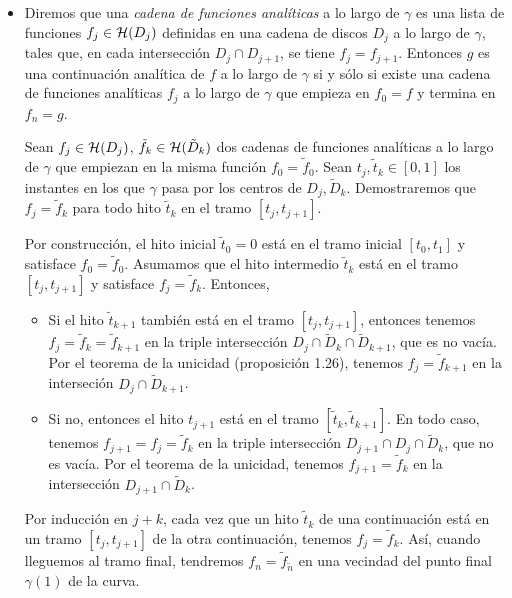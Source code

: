 \begin{solution}
\leavevmode
\begin{itemize}
    \item Diremos que una \textit{cadena de funciones analíticas} a lo largo de $\gamma$ es una lista de funciones $f_j \in \mathcal H(D_j)$ definidas en una cadena de discos $D_j$ a lo largo de $\gamma$, tales que, en cada intersección $D_j \cap D_{j+1}$, se tiene $f_j = f_{j+1}$. Entonces $g$ es una continuación analítica de $f$ a lo largo de $\gamma$ si y sólo si existe una cadena de funciones analíticas $f_j$ a lo largo de $\gamma$ que empieza en $f_0 = f$ y termina en $f_n = g$.
    
    Sean $f_j \in \mathcal H(D_j)$, $\tilde f_k \in \mathcal H(\tilde D_k)$ dos cadenas de funciones analíticas a lo largo de $\gamma$ que empiezan en la misma función $f_0 = \tilde f_0$. Sean $t_j, \tilde t_k \in [0,1]$ los instantes en los que $\gamma$ pasa por los centros de $D_j, \tilde D_k$. Demostraremos que $f_j = \tilde f_k$ para todo hito $\tilde t_k$ en el tramo $[t_j, t_{j+1}]$.
    
    Por construcción, el hito inicial $\tilde t_0 = 0$ está en el tramo inicial $[t_0, t_1]$ y satisface $f_0 = \tilde f_0$. Asumamos que el hito intermedio $\tilde t_k$ está en el tramo $[t_j, t_{j+1}]$ y satisface $f_j = \tilde f_k$. Entonces,
    \begin{itemize}
        \item Si el hito $\tilde t_{k+1}$ también está en el tramo $[t_j, t_{j+1}]$, entonces tenemos $f_j = \tilde f_k = \tilde f_{k+1}$ en la triple intersección $D_j \cap \tilde D_k \cap \tilde D_{k+1}$, que es no vacía. Por el teorema de la unicidad (proposición 1.26), tenemos $f_j = \tilde f_{k+1}$ en la interseción $D_j \cap \tilde D_{k+1}$.
        
        \item Si no, entonces el hito $t_{j+1}$ está en el tramo $[\tilde t_k, \tilde t_{k+1}]$. En todo caso, tenemos $f_{j+1} = f_j = \tilde f_k$ en la triple intersección $D_{j+1} \cap D_j \cap \tilde D_k$, que no es vacía. Por el teorema de la unicidad, tenemos $f_{j+1} = \tilde f_k$ en la intersección $D_{j+1} \cap \tilde D_k$.
    \end{itemize}
    
    Por inducción en $j+k$, cada vez que un hito $\tilde t_k$ de una continuación está en un tramo $[t_j, t_{j+1}]$ de la otra continuación, tenemos $f_j = \tilde f_k$. Así, cuando lleguemos al tramo final, tendremos $f_n = \tilde f_{\tilde n}$ en una vecindad del punto final $\gamma(1)$ de la curva.
    

\end{itemize}
\end{solution}
